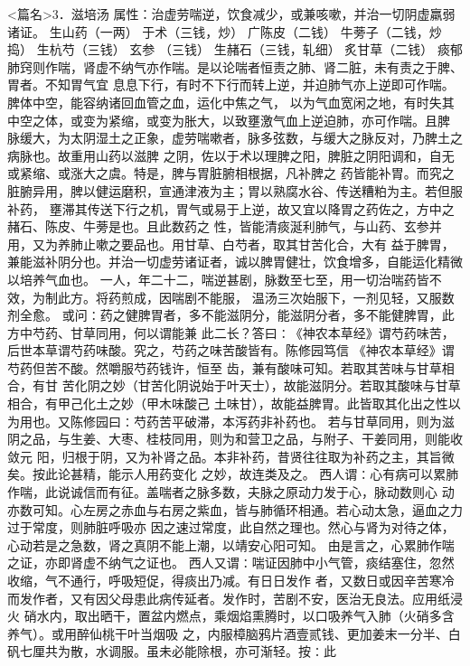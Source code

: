 \documentclass[a4paper,12pt,UTF8,twoside]{ctexbook}
\begin{document}
<篇名>3．滋培汤
属性：治虚劳喘逆，饮食减少，或兼咳嗽，并治一切阴虚羸弱诸证。 
生山药（一两） 于术（三钱，炒） 广陈皮（二钱） 牛蒡子（二钱，炒捣） 生杭芍（三钱） 玄参 
（三钱） 生赭石（三钱，轧细） 炙甘草（二钱） 
痰郁肺窍则作喘，肾虚不纳气亦作喘。是以论喘者恒责之肺、肾二脏，未有责之于脾、胃者。不知胃气宜 
息息下行，有时不下行而转上逆，并迫肺气亦上逆即可作喘。脾体中空，能容纳诸回血管之血，运化中焦之气， 
以为气血宽闲之地，有时失其中空之体，或变为紧缩，或变为胀大，以致壅激气血上逆迫肺，亦可作喘。且脾 
脉缓大，为太阴湿土之正象，虚劳喘嗽者，脉多弦数，与缓大之脉反对，乃脾土之病脉也。故重用山药以滋脾 
之阴，佐以于术以理脾之阳，脾脏之阴阳调和，自无或紧缩、或涨大之虞。特是，脾与胃脏腑相根据，凡补脾之 
药皆能补胃。而究之脏腑异用，脾以健运磨积，宣通津液为主；胃以熟腐水谷、传送糟粕为主。若但服补药， 
壅滞其传送下行之机，胃气或易于上逆，故又宜以降胃之药佐之，方中之赭石、陈皮、牛蒡是也。且此数药之 
性，皆能清痰涎利肺气，与山药、玄参并用，又为养肺止嗽之要品也。用甘草、白芍者，取其甘苦化合，大有 
益于脾胃，兼能滋补阴分也。并治一切虚劳诸证者，诚以脾胃健壮，饮食增多，自能运化精微以培养气血也。 
一人，年二十二，喘逆甚剧，脉数至七至，用一切治喘药皆不效，为制此方。将药煎成，因喘剧不能服， 
温汤三次始服下，一剂见轻，又服数剂全愈。 
或问∶药之健脾胃者，多不能滋阴分，能滋阴分者，多不能健脾胃，此方中芍药、甘草同用，何以谓能兼 
此二长？答曰∶《神农本草经》谓芍药味苦，后世本草谓芍药味酸。究之，芍药之味苦酸皆有。陈修园笃信 
《神农本草经》谓芍药但苦不酸。然嚼服芍药钱许，恒至 齿，兼有酸味可知。若取其苦味与甘草相合，有甘 
苦化阴之妙（甘苦化阴说始于叶天士），故能滋阴分。若取其酸味与甘草相合，有甲己化土之妙（甲木味酸己 
土味甘），故能益脾胃。此皆取其化出之性以为用也。又陈修园曰∶芍药苦平破滞，本泻药非补药也。 
若与甘草同用，则为滋阴之品，与生姜、大枣、桂枝同用，则为和营卫之品，与附子、干姜同用，则能收敛元 
阳，归根于阴，又为补肾之品。本非补药，昔贤往往取为补药之主，其旨微矣。按此论甚精，能示人用药变化 
之妙，故连类及之。 
西人谓∶心有病可以累肺作喘，此说诚信而有征。盖喘者之脉多数，夫脉之原动力发于心，脉动数则心 
动亦数可知。心左房之赤血与右房之紫血，皆与肺循环相通。若心动太急，逼血之力过于常度，则肺脏呼吸亦 
因之速过常度，此自然之理也。然心与肾为对待之体，心动若是之急数，肾之真阴不能上潮，以靖安心阳可知。 
由是言之，心累肺作喘之证，亦即肾虚不纳气之证也。 
西人又谓∶喘证因肺中小气管，痰结塞住，忽然收缩，气不通行，呼吸短促，得痰出乃减。有日日发作 
者，又数日或因辛苦寒冷而发作者，又有因父母患此病传延者。发作时，苦剧不安，医治无良法。应用纸浸火 
硝水内，取出晒干，置盆内燃点，乘烟焰熏腾时，以口吸养气入肺（火硝多含养气）。或用醉仙桃干叶当烟吸 
之，内服樟脑鸦片酒壹贰钱、更加姜末一分半、白矾七厘共为散，水调服。虽未必能除根，亦可渐轻。按∶此 
\end{document}
